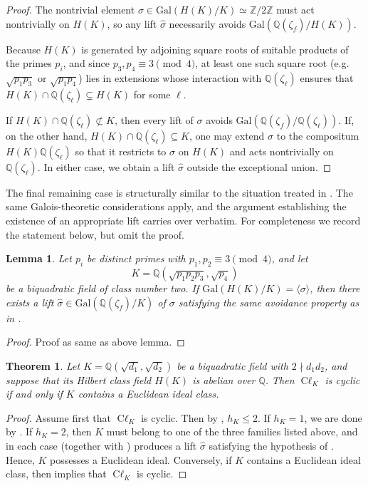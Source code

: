 \documentclass[12 pt]{amsart}
\newcommand{\Q}{\mathbb{Q}}
\newcommand{\Z}{\mathbb{Z}}
\newcommand\Gal{{\mathrm {Gal}}}
\newtheorem{theorem}[thm]{Theorem}
\newtheorem{lemma}[thm]{Lemma}
\theoremstyle{definition}
\theoremstyle{remark}
\DeclareMathOperator{\Cl}{C\ell}
\begin{document}
\begin{proof}
The nontrivial element $\sigma\in\Gal(H(K)/K)\simeq\Z/2\Z$ must act
nontrivially on $H(K)$, so any lift $\hat{\sigma}$ necessarily avoids
$\Gal(\Q(\zeta_f)/H(K))$.

Because $H(K)$ is generated by adjoining square roots of suitable products of
the primes $p_i$, and since $p_3,p_4\equiv3\pmod4$, at least one such square
root (e.g.\ $\sqrt{p_1p_3}$ or $\sqrt{p_1p_4}$) lies in 
extensions whose interaction with $\Q(\zeta_\ell)$ ensures that 
$H(K)\cap\Q(\zeta_\ell)\subsetneq H(K)$ for some $\ell$.

If $H(K)\cap\Q(\zeta_\ell)\not\subset K$, then every lift of $\sigma$ avoids
$\Gal(\Q(\zeta_f)/\Q(\zeta_\ell))$.  
If, on the other hand, $H(K)\cap\Q(\zeta_\ell)\subseteq K$, one may extend
$\sigma$ to the compositum $H(K)\Q(\zeta_\ell)$ so that it restricts to
$\sigma$ on $H(K)$ and acts nontrivially on $\Q(\zeta_\ell)$.  
In either case, we obtain a lift $\hat{\sigma}$ outside the exceptional
union.
\end{proof}

The final remaining case is structurally similar to the situation treated in 
.  
The same Galois-theoretic considerations apply, and the argument establishing the
existence of an appropriate lift carries over verbatim.  
For completeness we record the statement below, but omit the proof.
\begin{lemma}\label{existence_of_lift4}
Let $p_i$ be distinct primes with $p_1,p_2\equiv3\pmod4$, and let
\[
K=\Q(\sqrt{p_1p_2p_3},\sqrt{p_4})
\]
be a biquadratic field of class number two.  
If $\Gal(H(K)/K)=\langle\sigma\rangle$, then there exists a lift
$\hat{\sigma}\in\Gal(\Q(\zeta_f)/K)$ of $\sigma$ satisfying the same
avoidance property as in .
\end{lemma}
\begin{proof}
    Proof as same as  above lemma. 
\end{proof}

\begin{theorem}
Let $K=\Q(\sqrt{d_1},\sqrt{d_2})$ be a biquadratic field with 
$2\nmid d_1d_2$, and suppose that its Hilbert class field $H(K)$ is abelian
over $\Q$.  
Then $\Cl_K$ is cyclic if and only if $K$ contains a Euclidean ideal class.
\end{theorem}

\begin{proof}
Assume first that $\Cl_K$ is cyclic.  
Then by , $h_K\le2$.  
If $h_K=1$, we are done by \cite{Gra11,Gra13}.  
If $h_K=2$, then $K$ must belong to one of the three families listed above,
and in each case  (together with 
\cite{KrPa25}) produces a lift $\hat{\sigma}$ satisfying the hypothesis of 
.  
Hence, $K$ possesses a Euclidean ideal. Conversely, if $K$ contains a Euclidean ideal class, then 
\cite[Theorem~1.6]{Len79} implies that $\Cl_K$ is cyclic.
\end{proof}
\end{document}

